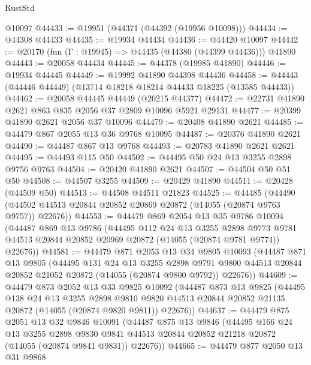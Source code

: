 \begin{lexlean}{RustStd}
\begin{coremodule}
    @10097
@44433 := @19951 (@44371 (@44392 (@19956 @10098)))
@44434 := @44308 @44433
@44435 := @19934 @44434
@44436 := @44420 @10097
@44442 := @20170 (fun (Γ : @19945) => @44435 (@44380 (@44399 @44436))) @41890
@44443 := @20058 @44434
@44445 := @44378 (@19985 @41890)
@44446 := @19934 @44445
@44449 := @19992 @41890 @44398 @44436
@44458 := @44443 (@44446 @44449) (@13714 @18218 @18214 @44433 @18225 (@13585 @44433))
@44462 := @20058 @44445 @44449 (@20215 @44377)
@44472 := @22731 @41890 @2621 @863 @835 @2056 @37 @2809 @10096 @5921 @29131
@44477 := @20399 @41890 @2621 @2056 @37 @10096
@44479 := @20408 @41890 @2621
@44485 := @44479 @867 @2055 @13 @36 @9768 @10095
@44487 := @20376 @41890 @2621
@44490 := @44487 @867 @13 @9768
@44493 := @20783 @41890 @2621 @2621
@44495 := @44493 @115 @50
@44502 := @44495 @50 @24 @13 @3255 @2898 @9756 @9763
@44504 := @20420 @41890 @2621
@44507 := @44504 @50 @51 @50
@44508 := @44507 @3255
@44509 := @20429 @41890
@44511 := @20428 (@44509 @50)
@44513 := @44508 @44511 @21823
@44525 := @44485
    (@44490 (@44502 @44513 @20844 @20852 @20869 @20872 (@14055 (@20874 @9763 @9757)) @22676))
@44553 := @44479
    @869
    @2054
    @13
    @35
    @9786
    @10094
    (@44487
      @869
      @13
      @9786
      (@44495
        @112
        @24
        @13
        @3255
        @2898
        @9773
        @9781
        @44513
        @20844
        @20852
        @20969
        @20872
        (@14055 (@20874 @9781 @9774))
        @22676))
@44581 := @44479
    @871
    @2053
    @13
    @34
    @9805
    @10093
    (@44487
      @871
      @13
      @9805
      (@44495
        @131
        @24
        @13
        @3255
        @2898
        @9791
        @9800
        @44513
        @20844
        @20852
        @21052
        @20872
        (@14055 (@20874 @9800 @9792))
        @22676))
@44609 := @44479
    @873
    @2052
    @13
    @33
    @9825
    @10092
    (@44487
      @873
      @13
      @9825
      (@44495
        @138
        @24
        @13
        @3255
        @2898
        @9810
        @9820
        @44513
        @20844
        @20852
        @21135
        @20872
        (@14055 (@20874 @9820 @9811))
        @22676))
@44637 := @44479
    @875
    @2051
    @13
    @32
    @9846
    @10091
    (@44487
      @875
      @13
      @9846
      (@44495
        @166
        @24
        @13
        @3255
        @2898
        @9830
        @9841
        @44513
        @20844
        @20852
        @21218
        @20872
        (@14055 (@20874 @9841 @9831))
        @22676))
@44665 := @44479
    @877
    @2050
    @13
    @31
    @9868

\end{coremodule}
\end{lexlean}
